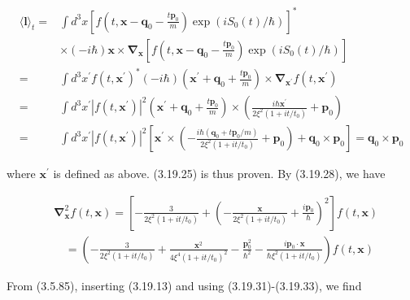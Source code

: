 \documentclass{article}
\begin{document}
\begin{align*}
\langle\boldsymbol{l}\rangle_{t}= & \int d^{3} x\left[f\left(t, \boldsymbol{x}-\boldsymbol{q}_{0}-\frac{t \boldsymbol{p}_{0}}{m}\right) \exp \left(i S_{0}(t) / \hbar\right)\right]^{*}  \tag{3.19.38}\\
& \times(-i \hbar) \boldsymbol{x} \times \boldsymbol{\nabla}_{\boldsymbol{x}}\left[f\left(t, \boldsymbol{x}-\boldsymbol{q}_{0}-\frac{t \boldsymbol{p}_{0}}{m}\right) \exp \left(i S_{0}(t) / \hbar\right)\right] \\
= & \int d^{3} x^{\prime} f\left(t, \boldsymbol{x}^{\prime}\right)^{*}(-i \hbar)\left(\boldsymbol{x}^{\prime}+\boldsymbol{q}_{0}+\frac{t \boldsymbol{p}_{0}}{m}\right) \times \boldsymbol{\nabla}_{\boldsymbol{x}^{\prime}} f\left(t, \boldsymbol{x}^{\prime}\right) \\
= & \int d^{3} x^{\prime}\left|f\left(t, \boldsymbol{x}^{\prime}\right)\right|^{2}\left(\boldsymbol{x}^{\prime}+\boldsymbol{q}_{0}+\frac{t \boldsymbol{p}_{0}}{m}\right) \times\left(\frac{i \hbar \boldsymbol{x}^{\prime}}{2 \xi^{2}\left(1+i t / t_{0}\right)}+\boldsymbol{p}_{0}\right) \\
= & \int d^{3} x^{\prime}\left|f\left(t, \boldsymbol{x}^{\prime}\right)\right|^{2}\left[\boldsymbol{x}^{\prime} \times\left(-\frac{i \hbar\left(\boldsymbol{q}_{0}+t \boldsymbol{p}_{0} / m\right)}{2 \xi^{2}\left(1+i t / t_{0}\right)}+\boldsymbol{p}_{0}\right)+\boldsymbol{q}_{0} \times \boldsymbol{p}_{0}\right]=\boldsymbol{q}_{0} \times \boldsymbol{p}_{0}
\end{align*}
 
where $\boldsymbol{x}^{\prime}$ is defined as above. (3.19.25) is thus proven.
By (3.19.28), we have
 
\begin{align*}
& \boldsymbol{\nabla}_{\boldsymbol{x}}^{2} f(t, \boldsymbol{x})=\left[-\frac{3}{2 \xi^{2}\left(1+i t / t_{0}\right)}+\left(-\frac{\boldsymbol{x}}{2 \xi^{2}\left(1+i t / t_{0}\right)}+\frac{i \boldsymbol{p}_{0}}{\hbar}\right)^{2}\right] f(t, \boldsymbol{x})  \tag{3.19.39}\\
& \quad=\left(-\frac{3}{2 \xi^{2}\left(1+i t / t_{0}\right)}+\frac{\boldsymbol{x}^{2}}{4 \xi^{4}\left(1+i t / t_{0}\right)^{2}}-\frac{\boldsymbol{p}_{0}^{2}}{\hbar^{2}}-\frac{i \boldsymbol{p}_{0} \cdot \boldsymbol{x}}{\hbar \xi^{2}\left(1+i t / t_{0}\right)}\right) f(t, \boldsymbol{x})
\end{align*}
 

From (3.5.85), inserting (3.19.13) and using (3.19.31)-(3.19.33), we find
 
\end{document}
